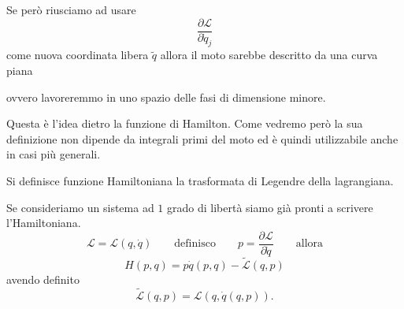 Se però riusciamo ad usare
\[
\frac{\partial \mathcal{L}}{\partial \dot q_j}
\]
come nuova coordinata libera \(\tilde q\)
allora il moto sarebbe descritto da una curva piana

\begin{center}
\end{center}

ovvero lavoreremmo in uno spazio delle fasi di dimensione minore.

Questa è l'idea dietro la funzione di Hamilton. Come vedremo però la sua definizione non dipende da integrali primi del moto ed è quindi utilizzabile anche in casi più generali.

\begin{definition}{}
Si definisce funzione Hamiltoniana la trasformata di Legendre della lagrangiana.
\end{definition}

Se consideriamo un sistema ad \(1\) grado di libertà siamo già pronti a scrivere l'Hamiltoniana.
\[
\mathcal{L}=\mathcal{L}(q,\dot q)
\qquad
\text{definisco}
\qquad
p=\frac{\partial \mathcal{L}}{\partial \dot q}
\qquad
\text{allora}
\]
\[
H(p,q)=p\dot q(p,q)-\tilde{\mathcal{L}}(q,p)
\]
avendo definito
\[
\tilde{\mathcal{L}}(q,p)=\mathcal{L}(q,\dot q(q,p)).
\]

